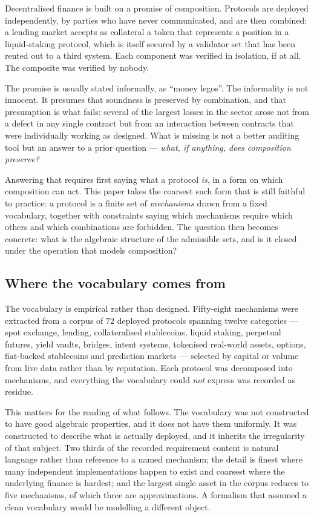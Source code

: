 \documentclass[11pt,reqno]{amsart}
\theoremstyle{plain}
\theoremstyle{definition}
\theoremstyle{remark}
\begin{document}
Decentralised finance is built on a promise of composition. Protocols are
deployed independently, by parties who have never communicated, and are then
combined: a lending market accepts as collateral a token that represents a
position in a liquid-staking protocol, which is itself secured by a validator
set that has been rented out to a third system. Each component was verified in
isolation, if at all. The composite was verified by nobody.

The promise is usually stated informally, as ``money legos''. The informality is
not innocent. It presumes that soundness is preserved by combination, and that
presumption is what fails: several of the largest losses in the sector arose not
from a defect in any single contract but from an interaction between contracts
that were individually working as designed. What is missing is not a better
auditing tool but an answer to a prior question --- \emph{what, if anything, does
composition preserve?}

Answering that requires first saying what a protocol \emph{is}, in a form on
which composition can act. This paper takes the coarsest such form that is still
faithful to practice: a protocol is a finite set of \emph{mechanisms} drawn from
a fixed vocabulary, together with constraints saying which mechanisms require
which others and which combinations are forbidden. The question then becomes
concrete: what is the algebraic structure of the admissible sets, and is it
closed under the operation that models composition?

\subsection{Where the vocabulary comes from}

The vocabulary is empirical rather than designed. Fifty-eight mechanisms were
extracted from a corpus of $72$ deployed protocols spanning twelve categories ---
spot exchange, lending, collateralised stablecoins, liquid staking, perpetual
futures, yield vaults, bridges, intent systems, tokenised real-world assets,
options, fiat-backed stablecoins and prediction markets --- selected by capital
or volume from live data rather than by reputation. Each protocol was decomposed
into mechanisms, and everything the vocabulary could \emph{not} express was
recorded as residue.

This matters for the reading of what follows. The vocabulary was not constructed
to have good algebraic properties, and it does not have them uniformly. It was
constructed to describe what is actually deployed, and it inherits the
irregularity of that subject. Two thirds of the recorded requirement
content is natural language rather than reference to a named mechanism; the
detail is finest where many independent implementations happen to exist and
coarsest where the underlying finance is hardest; and the largest single asset in
the corpus reduces to five mechanisms, of which three are approximations. A
formalism that assumed a clean vocabulary would be modelling a different object.
\end{document}
